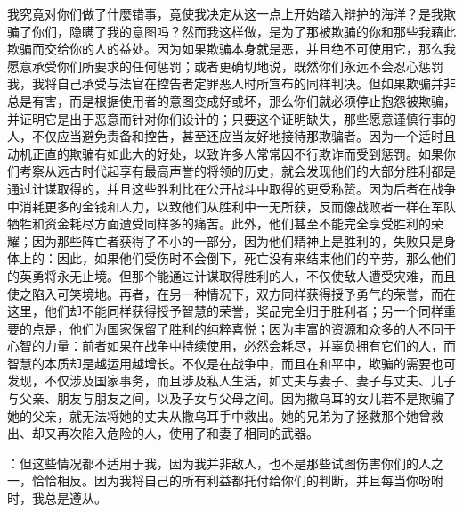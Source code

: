 我究竟对你们做了什麼错事，竟使我决定从这一点上开始踏入辩护的海洋？是我欺骗了你们，隐瞒了我的意图吗？然而我这样做，是为了那被欺骗的你和那些我藉此欺骗而交给你的人的益处。因为如果欺骗本身就是恶，并且绝不可使用它，那么我愿意承受你们所要求的任何惩罚；或者更确切地说，既然你们永远不会忍心惩罚我，我将自己承受与法官在控告者定罪恶人时所宣布的同样判决。但如果欺骗并非总是有害，而是根据使用者的意图变成好或坏，那么你们就必须停止抱怨被欺骗，并证明它是出于恶意而针对你们设计的；只要这个证明缺失，那些愿意谨慎行事的人，不仅应当避免责备和控告，甚至还应当友好地接待那欺骗者。因为一个适时且动机正直的欺骗有如此大的好处，以致许多人常常因不行欺诈而受到惩罚。如果你们考察从远古时代起享有最高声誉的将领的历史，就会发现他们的大部分胜利都是通过计谋取得的，并且这些胜利比在公开战斗中取得的更受称赞。因为后者在战争中消耗更多的金钱和人力，以致他们从胜利中一无所获，反而像战败者一样在军队牺牲和资金耗尽方面遭受同样多的痛苦。此外，他们甚至不能完全享受胜利的荣耀；因为那些阵亡者获得了不小的一部分，因为他们精神上是胜利的，失败只是身体上的：因此，如果他们受伤时不会倒下，死亡没有来结束他们的辛劳，那么他们的英勇将永无止境。但那个能通过计谋取得胜利的人，不仅使敌人遭受灾难，而且使之陷入可笑境地。再者，在另一种情况下，双方同样获得授予勇气的荣誉，而在这里，他们却不能同样获得授予智慧的荣誉，奖品完全归于胜利者；另一个同样重要的点是，他们为国家保留了胜利的纯粹喜悦；因为丰富的资源和众多的人不同于心智的力量：前者如果在战争中持续使用，必然会耗尽，并辜负拥有它们的人，而智慧的本质却是越运用越增长。不仅是在战争中，而且在和平中，欺骗的需要也可发现，不仅涉及国家事务，而且涉及私人生活，如丈夫与妻子、妻子与丈夫、儿子与父亲、朋友与朋友之间，以及子女与父母之间。因为撒乌耳的女儿若不是欺骗了她的父亲，就无法将她的丈夫从撒乌耳手中救出。她的兄弟为了拯救那个她曾救出、却又再次陷入危险的人，使用了和妻子相同的武器。\par

：但这些情况都不适用于我，因为我并非敌人，也不是那些试图伤害你们的人之一，恰恰相反。因为我将自己的所有利益都托付给你们的判断，并且每当你吩咐时，我总是遵从。\par

